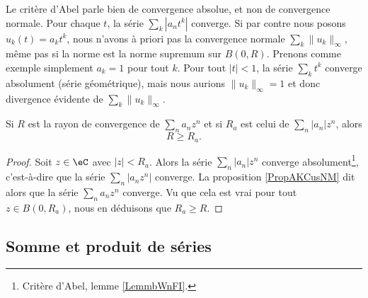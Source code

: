\begin{normaltext}
	Le critère d'Abel parle bien de convergence absolue, et non de convergence normale. Pour chaque \( t\), la série \( \sum_k | a_nt^k |\) converge. Si par contre nous posons \( u_k(t)=a_kt^k\), nous n'avons à priori pas la convergence normale \( \sum_k\| u_k \|_{\infty}\), même pas si la norme est la norme supremum sur \( B(0,R)\). Prenons comme exemple simplement \( a_k=1\) pour tout \( k\). Pour tout \( | t |<1\), la série \( \sum_k t^k\) converge absolument (série géométrique), mais nous aurions \( \| u_k \|_{\infty}=1\) et donc divergence évidente de \( \sum_k\| u_k \|_{\infty}\).
\end{normaltext}

\begin{proposition}	\label{PROPooLNJSooWdieDi}
	Si \( R\) est la rayon de convergence de \( \sum_na_nz^n\) et si \( R_a\) est celui de \( \sum_n| a_n |z^n\), alors
	\begin{equation}
		R\geq R_a.
	\end{equation}
\end{proposition}

\begin{proof}
	Soit \( z\in \eC\) avec \( | z |<R_a\). Alors la série \( \sum_n| a_n |z^n\) converge absolument\footnote{Critère d'Abel, lemme \ref{LemmbWnFI}.}, c'est-à-dire que la série \( \sum_n| a_nz^n |\) converge. La proposition \ref{PropAKCusNM} dit alors que la série \( \sum_na_nz^n\) converge. Vu que cela est vrai pour tout \( z\in B(0,R_a)\), nous en déduisons que \( R_a\geq R\).
\end{proof}


\subsection{Somme et produit de séries}

